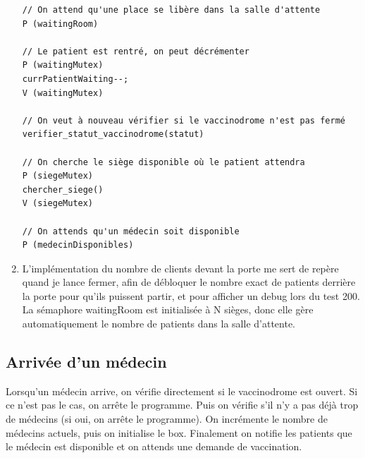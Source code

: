 \documentclass[a4paper]{article}
\begin{document}
\begin{enumerate}
\begin{verbatim}
// On attend qu'une place se libère dans la salle d'attente
P (waitingRoom)

// Le patient est rentré, on peut décrémenter
P (waitingMutex)
currPatientWaiting--;
V (waitingMutex)

// On veut à nouveau vérifier si le vaccinodrome n'est pas fermé
verifier_statut_vaccinodrome(statut)

// On cherche le siège disponible où le patient attendra
P (siegeMutex)
chercher_siege()
V (siegeMutex)

// On attends qu'un médecin soit disponible
P (medecinDisponibles)

    \end{verbatim}

    \item L'implémentation du nombre de clients devant la porte me sert de repère quand je lance fermer,
    afin de débloquer le nombre exact de patients derrière la porte pour qu'ils puissent partir, et pour afficher un debug lors du test 200. La sémaphore waitingRoom est initialisée à N sièges, donc elle gère automatiquement le nombre de patients dans la salle d'attente.
  \end{enumerate}
  \newpage
  \subsection{Arrivée d'un médecin}

  Lorsqu'un médecin arrive, on vérifie directement si le vaccinodrome est ouvert. Si ce n'est pas le cas, on arrête le programme. Puis on vérifie s'il n'y a pas déjà trop de médecins (si oui, on arrête le programme). On incrémente le nombre de médecins actuels, puis on initialise le box.
  Finalement on notifie les patients que le médecin est disponible et on attends une demande de vaccination.
\end{document}
